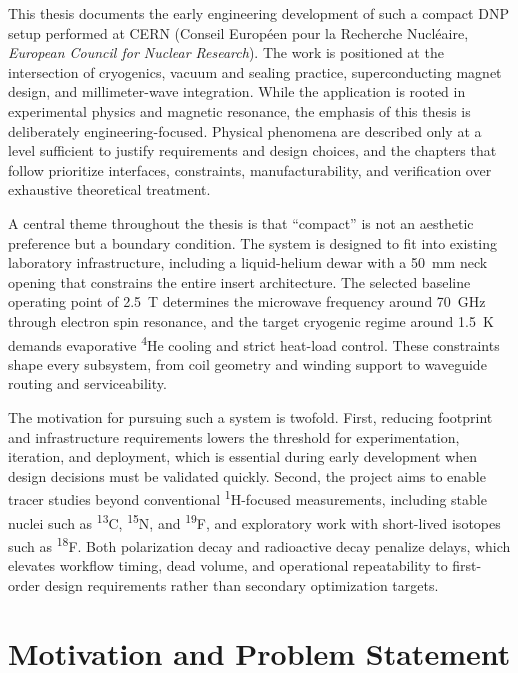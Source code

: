 \documentclass[FM,DP,EN,twoside]{tulthesis}
\begin{document}
This thesis documents the early engineering development of such a compact DNP setup performed at CERN (Conseil Europ\'een pour la Recherche Nucl\'eaire, \textit{European Council for Nuclear Research}). The work is positioned at the intersection of cryogenics, vacuum and sealing practice, superconducting magnet design, and millimeter-wave integration. While the application is rooted in experimental physics and magnetic resonance, the emphasis of this thesis is deliberately engineering-focused. Physical phenomena are described only at a level sufficient to justify requirements and design choices, and the chapters that follow prioritize interfaces, constraints, manufacturability, and verification over exhaustive theoretical treatment.

A central theme throughout the thesis is that ``compact'' is not an aesthetic preference but a boundary condition. The system is designed to fit into existing laboratory infrastructure, including a liquid-helium dewar with a \SI{50}{\milli\meter} neck opening that constrains the entire insert architecture. The selected baseline operating point of \SI{2.5}{\tesla} determines the microwave frequency around \SI{70}{\giga\hertz} through electron spin resonance, and the target cryogenic regime around \SI{1.5}{\kelvin} demands evaporative \textsuperscript{4}He cooling and strict heat-load control. These constraints shape every subsystem, from coil geometry and winding support to waveguide routing and serviceability.

The motivation for pursuing such a system is twofold. First, reducing footprint and infrastructure requirements lowers the threshold for experimentation, iteration, and deployment, which is essential during early development when design decisions must be validated quickly. Second, the project aims to enable tracer studies beyond conventional \textsuperscript{1}H-focused measurements, including stable nuclei such as \textsuperscript{13}C, \textsuperscript{15}N, and \textsuperscript{19}F, and exploratory work with short-lived isotopes such as \textsuperscript{18}F. Both polarization decay and radioactive decay penalize delays, which elevates workflow timing, dead volume, and operational repeatability to first-order design requirements rather than secondary optimization targets.


\section{Motivation and Problem Statement}
\label{sec:motivation-problem-statement}
\end{document}

